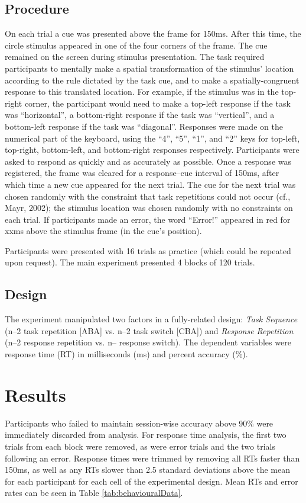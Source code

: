 \documentclass[a4paper, doc, natbib]{apa6}
\begin{document}
\subsection{Procedure}
On each trial a cue was presented above the frame for 150ms. After this time, the circle stimulus appeared in one of the four corners of the frame. The cue remained on the screen during stimulus presentation. The task required participants to mentally make a spatial transformation of the stimulus' location according to the rule dictated by the task cue, and to make a spatially-congruent response to this translated location. For example, if the stimulus was in the top-right corner, the participant would need to make a top-left response if the task was ``horizontal'', a bottom-right response if the task was ``vertical'', and a bottom-left response if the task was ``diagonal''. Responses were made on the numerical part of the keyboard, using the ``4'', ``5'', ``1'', and ``2'' keys for top-left, top-right, bottom-left, and bottom-right responses respectively. Participants were asked to respond as quickly and as accurately as possible. Once a response was registered, the frame was cleared for a response--cue interval of 150ms, after which time a new cue appeared for the next trial. The cue for the next trial was chosen randomly with the constraint that task repetitions could not occur (cf., Mayr, 2002); the stimulus location was chosen randomly with no constraints on each trial. If participants made an error, the word ``Error!'' appeared in red for xxms above the stimulus frame (in the cue's position).

Participants were presented with 16 trials as practice (which could be repeated upon request). The main experiment presented 4 blocks of 120 trials. 

\subsection{Design}
The experiment manipulated two factors in a fully-related design: \emph{Task Sequence} (n--2 task repetition [ABA] vs. n--2 task switch [CBA]) and \emph{Response Repetition} (n--2 response repetition vs. n-- response switch). The dependent variables were response time (RT) in milliseconds (ms) and percent accuracy (\%).


\section{Results}
Participants who failed to maintain session-wise accuracy above 90\% were immediately discarded from analysis. For response time analysis, the first two trials from each block were removed, as were error trials and the two trials following an error. Response times were trimmed by removing all RTs faster than 150ms, as well as any RTs slower than 2.5 standard deviations above the mean for each participant for each cell of the experimental design. Mean RTs and error rates can be seen in Table \ref{tab:behaviouralData}.
\end{document}
